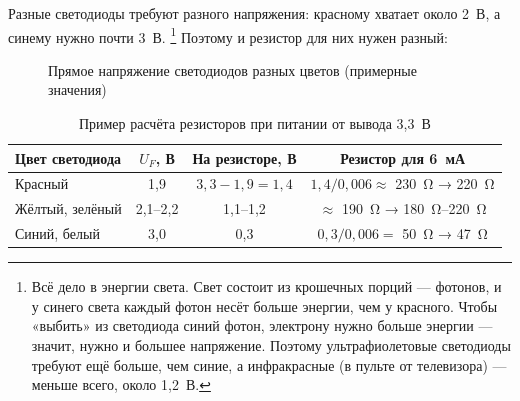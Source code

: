 Разные светодиоды требуют разного напряжения: красному хватает около 2~В, а синему нужно почти 3~В.%
\footnote{Всё дело в энергии света. Свет состоит из крошечных порций --- фотонов, и у синего света
каждый фотон несёт больше энергии, чем у красного. Чтобы «выбить» из светодиода синий фотон, электрону
нужно больше энергии --- значит, нужно и большее напряжение. Поэтому ультрафиолетовые светодиоды
требуют ещё больше, чем синие, а инфракрасные (в пульте от телевизора) --- меньше всего, около 1,2~В.}
Поэтому и резистор для них нужен разный:

\begin{figure}[H]
\centering
{}
\caption{Прямое напряжение светодиодов разных цветов (примерные значения)}
\end{figure}

\begin{table}[H]
\centering\small
\begin{tabular}{@{}lccc@{}}
\toprule
Цвет светодиода & $U_F$, В & На резисторе, В & Резистор для 6~мА\\
\midrule
Красный & 1,9 & $3{,}3-1{,}9=1{,}4$ & $1{,}4 / 0{,}006 \approx$ \SI{230}{\ohm} → \SI{220}{\ohm}\\
Жёлтый, зелёный & 2,1--2,2 & 1,1--1,2 & $\approx$ \SI{190}{\ohm} → \SI{180}{\ohm}--\SI{220}{\ohm}\\
Синий, белый & 3,0 & 0,3 & $0{,}3 / 0{,}006 = $ \SI{50}{\ohm} → \SI{47}{\ohm}\\
\bottomrule
\end{tabular}
\caption{Пример расчёта резисторов при питании от вывода 3,3~В}
\end{table}


